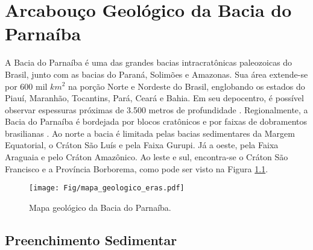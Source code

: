 \chapter{Arcabouço Geológico da Bacia do Parnaíba}

A Bacia do Parnaíba é uma das grandes bacias intracratônicas paleozoicas do Brasil, junto com as bacias do Paraná, Solimões e Amazonas. Sua área extende-se por 600 mil $km^{2}$ na porção Norte e Nordeste do Brasil, englobando os estados do Piauí, Maranhão, Tocantins, Pará, Ceará e Bahia. Em seu depocentro, é possível observar espessuras próximas de 3.500 metros de profundidade \citep{goes_feijo_1994,vaz_bacia_2007}. Regionalmente, a Bacia do Parnaíba é bordejada por blocos cratônicos e por faixas de dobramentos brasilianas \citep{cordani_bacia_2009,de_castro_crustal_2014}. Ao norte a bacia é limitada pelas bacias sedimentares da Margem Equatorial, o Cráton São Luís e pela Faixa Gurupi. Já a oeste, pela Faixa Araguaia e pelo Cráton Amazônico. Ao leste e sul, encontra-se o Cráton São Francisco e a Província Borborema, como pode ser visto na Figura \ref{mapa_geologico}.

\begin{figure}[!ht]
\begin{center}
\texttt{[image: Fig/mapa\_geologico\_eras.pdf]}
\caption{Mapa geológico da Bacia do Parnaíba.}
\label{mapa_geologico}
\end{center}
\end{figure}

\section{Preenchimento Sedimentar}

